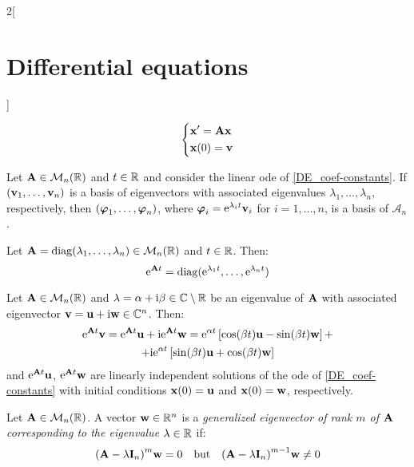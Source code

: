\documentclass[../../../main.tex]{subfiles}
\begin{document}
\begin{multicols}{2}[\section{Differential equations}]
\begin{prop}
    $$
      \left\{
      \begin{aligned}
         & \boldsymbol{\mathrm{x}}'      =\boldsymbol{\mathrm{A}}\boldsymbol{\mathrm{x}} \\
         & \boldsymbol{\mathrm{x}}(0)  =\boldsymbol{\mathrm{v}}
      \end{aligned}
      \right.
    $$
  \end{prop}
  \begin{corollary}
    Let $\boldsymbol{\mathrm{A}}\in\mathcal{M}_n(\mathbb{R})$ and $t\in\mathbb{R}$ and consider the linear ode of \cref{DE_coef-constants}. If $(\boldsymbol{\mathrm{v}}_1,\ldots,\boldsymbol{\mathrm{v}}_n)$ is a basis of eigenvectors with associated eigenvalues $\lambda_1,\ldots,\lambda_n$, respectively, then $(\boldsymbol{\mathrm{\varphi}}_1,\ldots,\boldsymbol{\mathrm{\varphi}}_n)$, where $\boldsymbol{\mathrm{\varphi}}_i=\mathrm{e}^{\lambda_it}\boldsymbol{\mathrm{v}}_i$ for $i=1,\ldots,n$, is a basis of $\mathcal{A}_n$.
  \end{corollary}
  \begin{lemma}
    Let $\boldsymbol{\mathrm{A}}=\operatorname{diag}(\lambda_1,\ldots,\lambda_n)\in\mathcal{M}_n(\mathbb{R})$ and $t\in\mathbb{R}$. Then:
    $$\mathrm{e}^{\boldsymbol{\mathrm{A}}t}=\operatorname{diag}(\mathrm{e}^{\lambda_1 t},\ldots,\mathrm{e}^{\lambda_n t})$$
  \end{lemma}
  \begin{prop}
    Let $\boldsymbol{\mathrm{A}}\in\mathcal{M}_n(\mathbb{R})$ and $\lambda=\alpha+\mathrm{i}\beta\in\mathbb{C}\setminus\mathbb{R}$ be an eigenvalue of $\boldsymbol{\mathrm{A}}$ with associated eigenvector $\boldsymbol{\mathrm{v}}=\boldsymbol{\mathrm{u}}+\mathrm{i}\boldsymbol{\mathrm{w}}\in\mathbb{C}^n$. Then:
    \begin{multline*}
      \mathrm{e}^{\boldsymbol{\mathrm{A}}t}\boldsymbol{\mathrm{v}}=\mathrm{e}^{\boldsymbol{\mathrm{A}}t}\boldsymbol{\mathrm{u}}+\mathrm{i}\mathrm{e}^{\boldsymbol{\mathrm{A}}t}\boldsymbol{\mathrm{w}}=\mathrm{e}^{\alpha t}\left[\cos(\beta t)\boldsymbol{\mathrm{u}}-\sin(\beta t)\boldsymbol{\mathrm{w}}\right]+\\+\mathrm{i}\mathrm{e}^{\alpha t}\left[\sin(\beta t)\boldsymbol{\mathrm{u}}+\cos(\beta t)\boldsymbol{\mathrm{w}}\right]
    \end{multline*}
    and $\mathrm{e}^{\boldsymbol{\mathrm{A}}t}\boldsymbol{\mathrm{u}}$, $\mathrm{e}^{\boldsymbol{\mathrm{A}}t}\boldsymbol{\mathrm{w}}$ are linearly independent solutions of the ode of \cref{DE_coef-constants} with initial conditions $\boldsymbol{\mathrm{x}}(0)=\boldsymbol{\mathrm{u}}$ and $\boldsymbol{\mathrm{x}}(0)=\boldsymbol{\mathrm{w}}$, respectively.
  \end{prop}
  \begin{definition}
    Let $\boldsymbol{\mathrm{A}}\in\mathcal{M}_n(\mathbb{R})$. A vector $\boldsymbol{\mathrm{w}}\in\mathbb{R}^n$ is a \textit{generalized eigenvector of rank $m$ of $\boldsymbol{\mathrm{A}}$ corresponding to the eigenvalue $\lambda\in\mathbb{R}$} if: $${(\boldsymbol{\mathrm{A}}-\lambda\boldsymbol{\mathrm{I}}_n)}^m\boldsymbol{\mathrm{w}}=0\quad\text{but}\quad{(\boldsymbol{\mathrm{A}}-\lambda\boldsymbol{\mathrm{I}}_n)}^{m-1}\boldsymbol{\mathrm{w}}\ne 0$$

\end{definition}
\end{multicols}
\end{document}
